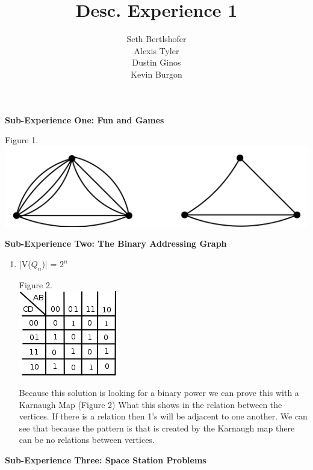 \documentclass[10pt,a4paper]{report}
\author{Seth Bertlshofer\\Alexis Tyler\\Dustin Ginos\\Kevin Burgon}
\title{Desc. Experience 1}
\begin{document}
	\maketitle
	\textbf{Sub-Experience One: Fun and Games}\\
		\begin{center}
			Figure 1.\\
			\includegraphics[scale=.5]{e1.png}
			\newline
			\newline
		\end{center}

	\textbf{Sub-Experience Two: The Binary Addressing Graph}\\
		\begin{enumerate}
			\item |V($Q_n$)| = $2^n$
			\begin{center}
				Figure 2.\\
				\includegraphics[scale=.5]{2_1.png}
			\end{center}
			Because this solution is looking for a binary power we can prove this with a Karnaugh Map (Figure 2) What this shows in the relation between the vertices.  If there is a relation then 1's will be adjacent to one another.  We can see that because the pattern is that is created by the Karnaugh map there can be no relations between vertices. 
		\end{enumerate}
		
		
	\textbf{Sub-Experience Three: Space Station Problems}\\
	
\end{document}
